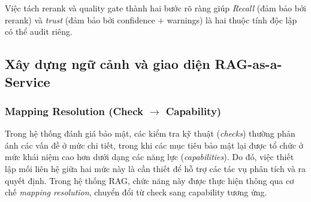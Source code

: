 Việc tách rerank và quality gate thành hai bước rõ ràng giúp \textit{Recall} (đảm bảo bởi rerank) và \textit{trust} (đảm bảo bởi confidence + warnings) là hai thuộc tính độc lập có thể audit riêng.


\subsection{Xây dựng ngữ cảnh và giao diện RAG-as-a-Service}

\subsubsection*{Mapping Resolution (Check $\rightarrow$ Capability)}

Trong hệ thống đánh giá bảo mật, các kiểm tra kỹ thuật (\textit{checks}) thường phản ánh các vấn đề ở mức chi tiết, trong khi các mục tiêu bảo mật lại được tổ chức ở mức khái niệm cao hơn dưới dạng các năng lực (\textit{capabilities}). Do đó, việc thiết lập mối liên hệ giữa hai mức này là cần thiết để hỗ trợ các tác vụ phân tích và ra quyết định. Trong hệ thống RAG, chức năng này được thực hiện thông qua cơ chế \textit{mapping resolution}, chuyển đổi từ check sang capability tương ứng.

